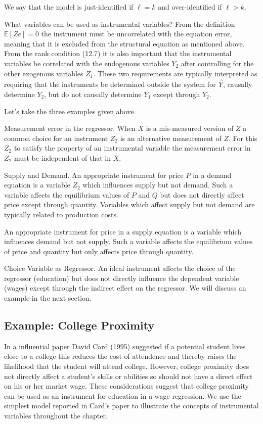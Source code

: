 \documentclass[10pt]{article}
\begin{document}
We say that the model is just-identified if $\ell=k$ and over-identified if $\ell>k$.

What variables can be used as instrumental variables? From the definition $\mathbb{E}[Z e]=0$ the instrument must be uncorrelated with the equation error, meaning that it is excluded from the structural equation as mentioned above. From the rank condition (12.7) it is also important that the instrumental variables be correlated with the endogenous variables $Y_{2}$ after controlling for the other exogenous variables $Z_{1}$. These two requirements are typically interpreted as requiring that the instruments be determined outside the system for $\vec{Y}$, causally determine $Y_{2}$, but do not causally determine $Y_{1}$ except through $Y_{2}$.

Let's take the three examples given above.

Measurement error in the regressor. When $X$ is a mis-measured version of $Z$ a common choice for an instrument $Z_{2}$ is an alternative measurement of $Z$. For this $Z_{2}$ to satisfy the property of an instrumental variable the measurement error in $Z_{2}$ must be independent of that in $X$.

Supply and Demand. An appropriate instrument for price $P$ in a demand equation is a variable $Z_{2}$ which influences supply but not demand. Such a variable affects the equilibrium values of $P$ and $Q$ but does not directly affect price except through quantity. Variables which affect supply but not demand are typically related to production costs.

An appropriate instrument for price in a supply equation is a variable which influences demand but not supply. Such a variable affects the equilibrium values of price and quantity but only affects price through quantity.

Choice Variable as Regressor. An ideal instrument affects the choice of the regressor (education) but does not directly influence the dependent variable (wages) except through the indirect effect on the regressor. We will discuss an example in the next section.

\subsection{Example: College Proximity}
In a influential paper David Card (1995) suggested if a potential student lives close to a college this reduces the cost of attendence and thereby raises the likelihood that the student will attend college. However, college proximity does not directly affect a student's skills or abilities so should not have a direct effect on his or her market wage. These considerations suggest that college proximity can be used as an instrument for education in a wage regression. We use the simplest model reported in Card's paper to illustrate the concepts of instrumental variables throughout the chapter.
\end{document}
